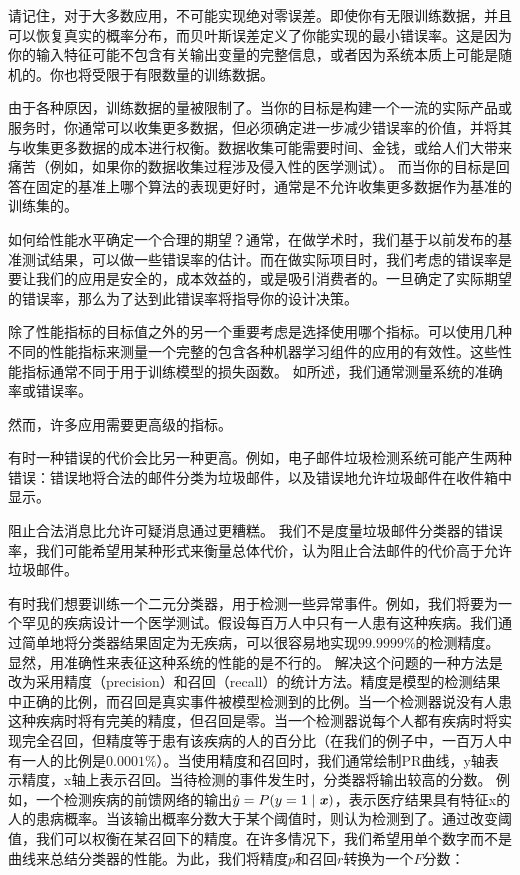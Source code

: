 请记住，对于大多数应用，不可能实现绝对零误差。即使你有无限训练数据，并且可以恢复真实的概率分布，而贝叶斯误差定义了你能实现的最小错误率。这是因为你的输入特征可能不包含有关输出变量的完整信息，或者因为系统本质上可能是随机的。你也将受限于有限数量的训练数据。

由于各种原因，训练数据的量被限制了。当你的目标是构建一个一流的实际产品或服务时，你通常可以收集更多数据，但必须确定进一步减少错误率的价值，并将其与收集更多数据的成本进行权衡。数据收集可能需要时间、金钱，或给人们大带来痛苦（例如，如果你的数据收集过程涉及侵入性的医学测试）。 而当你的目标是回答在固定的基准上哪个算法的表现更好时，通常是不允许收集更多数据作为基准的训练集的。

如何给性能水平确定一个合理的期望？通常，在做学术时，我们基于以前发布的基准测试结果，可以做一些错误率的估计。而在做实际项目时，我们考虑的错误率是要让我们的应用是安全的，成本效益的，或是吸引消费者的。一旦确定了实际期望的错误率，那么为了达到此错误率将指导你的设计决策。

除了性能指标的目标值之外的另一个重要考虑是选择使用哪个指标。可以使用几种不同的性能指标来测量一个完整的包含各种机器学习组件的应用的有效性。这些性能指标通常不同于用于训练模型的损失函数。 如所述，我们通常测量系统的准确率或错误率。

然而，许多应用需要更高级的指标。

有时一种错误的代价会比另一种更高。例如，电子邮件垃圾检测系统可能产生两种错误：错误地将合法的邮件分类为垃圾邮件，以及错误地允许垃圾邮件在收件箱中显示。

阻止合法消息比允许可疑消息通过更糟糕。 我们不是度量垃圾邮件分类器的错误率，我们可能希望用某种形式来衡量总体代价，认为阻止合法邮件的代价高于允许垃圾邮件。

有时我们想要训练一个二元分类器，用于检测一些异常事件。例如，我们将要为一个罕见的疾病设计一个医学测试。假设每百万人中只有一人患有这种疾病。我们通过简单地将分类器结果固定为无疾病，可以很容易地实现$99.9999\%$的检测精度。显然，用准确性来表征这种系统的性能的是不行的。 解决这个问题的一种方法是改为采用精度（precision）和召回（recall）的统计方法。精度是模型的检测结果中正确的比例，而召回是真实事件被模型检测到的比例。当一个检测器说没有人患这种疾病时将有完美的精度，但召回是零。当一个检测器说每个人都有疾病时将实现完全召回，但精度等于患有该疾病的人的百分比（在我们的例子中，一百万人中有一人的比例是$0.0001\%$）。当使用精度和召回时，我们通常绘制PR曲线，y轴表示精度，x轴上表示召回。当待检测的事件发生时，分类器将输出较高的分数。 例如，一个检测疾病的前馈网络的输出$\hat{y} = P(y=1\mid\boldsymbol{\mathit{x}})$，表示医疗结果具有特征x的人的患病概率。当该输出概率分数大于某个阈值时，则认为检测到了。通过改变阈值，我们可以权衡在某召回下的精度。在许多情况下，我们希望用单个数字而不是曲线来总结分类器的性能。为此，我们将精度$p$和召回$r$转换为一个$F$分数：

